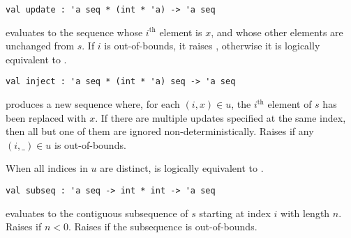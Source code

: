 \begin{cluster}
\label{grp:gr:update}

\begin{gram}[update]
\label{gr:update}
\begin{verbatim}
val update : 'a seq * (int * 'a) -> 'a seq
\end{verbatim}
 evaluates to the sequence whose $i^\text{th}$ element
is $x$, and whose other elements are unchanged from $s$. If $i$ is out-of-bounds,
it raises , otherwise it is logically equivalent to
.

\end{gram}
\end{cluster}

\begin{flex}
\label{grp:grm:seq-interface::inject}

\begin{gram}
\label{grm:seq-interface::inject}
\begin{gram}[inject]
\label{gr:inject}
\begin{verbatim}
val inject : 'a seq * (int * 'a) seq -> 'a seq
\end{verbatim}
 produces a new sequence where, for each $(i,x) \in u$,
the $i^\text{th}$ element of $s$ has been replaced with $x$. If there are
multiple updates specified
at the same index, then all but one of them are ignored non-deterministically.
Raises  if any $(i,\_) \in u$ is out-of-bounds.
\end{gram}
\begin{note}
When all indices in $u$ are distinct,  is logically
equivalent to .
\end{note}

\end{gram}
\end{flex}

\begin{cluster}
\label{grp:gr:subseq}

\begin{gram}[subseq]
\label{gr:subseq}
\begin{verbatim}
val subseq : 'a seq -> int * int -> 'a seq
\end{verbatim}
 evaluates to the contiguous subsequence of $s$ starting
at index $i$ with length $n$. Raises  if $n < 0$. Raises 
if the subsequence is out-of-bounds.

\end{gram}
\end{cluster}

